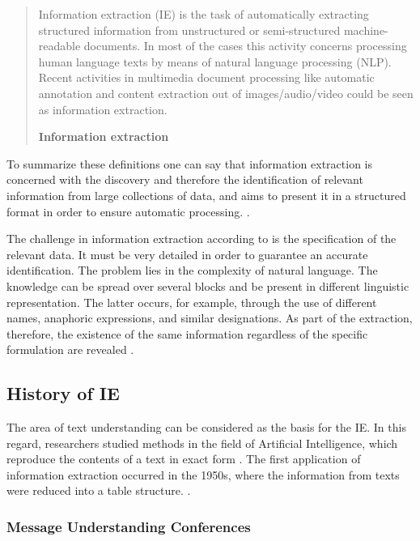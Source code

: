 \begin{quote}
Information extraction (IE) is the task of automatically extracting structured information from unstructured or semi-structured machine-readable documents. In most of the cases this activity concerns processing human language texts by means of natural language processing (NLP). Recent activities in multimedia document processing like automatic annotation and content extraction out of images/audio/video could be seen as information extraction.

\hfill \textbf{Information extraction}

\hfill \citeauthor{Wikipedia:IE:2012} \cite{Wikipedia:IE:2012}
\end{quote}

To summarize these definitions one can say that information extraction is concerned with the discovery and therefore the identification of relevant information from large collections of data, and aims to present it in a structured format in order to ensure automatic processing. \cite{Lehnert:1994}\cite{Neumann:2001}\cite{Siefkes:2007}.

The challenge in information extraction according to \cite{Grishman:2003} is the specification of the relevant data. It must be very detailed in order to guarantee an accurate identification. The problem lies in the complexity of natural language. The knowledge can be spread over several blocks and be present in different linguistic representation. The latter occurs, for example, through the use of different names, anaphoric expressions, and similar designations. As part of the extraction, therefore, the existence of the same information regardless of the specific formulation are revealed \cite{Cole:1998}\cite{Grishman:2003}\cite{Grishman:2007}\cite{Linsmayr:2010}.

\subsection{History of \acl{IE}}
The area of text understanding can be considered as the basis for the \gls{IE}. In this regard, researchers studied methods in the field of Artificial Intelligence, which reproduce the contents of a text in exact form \cite{Siefkes:2007}\cite{Eikvil:1999}. The first application of information extraction occurred in the 1950s, where  the information from texts  were reduced into a table structure. \cite{Grishman:1997}\cite{Gaizauskas:1998}\cite{Wilks:1997}.

\subsubsection{Message Understanding Conferences}

